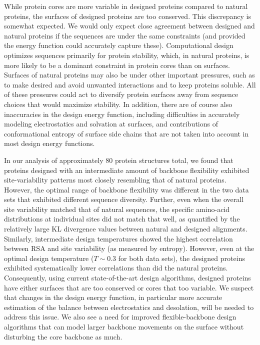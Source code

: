\documentclass[12pt]{article}
\begin{document}
While protein cores are more variable in designed proteins compared to natural proteins, the surfaces of designed proteins are too conserved. This discrepancy is somewhat expected. We would only expect close agreement between designed and natural proteins if the sequences are under the same constraints (and provided the energy function could accurately capture these). Computational design optimizes sequences primarily for protein stability, which, in natural proteins, is more likely to be a dominant constraint in protein cores than on surfaces. Surfaces of natural proteins may also be under other important pressures, such as to make desired and avoid unwanted interactions and to keep proteins soluble. All of these pressures could act to diversify protein surfaces away from sequence choices that would maximize stability. In addition, there are of course also inaccuracies in the design energy function, including difficulties in accurately modeling electrostatics and solvation at surfaces, and contributions of conformational entropy of surface side chains that are not taken into account in most design energy functions.

In our analysis of approximately 80 protein structures total, we found that proteins designed with an intermediate amount of backbone flexibility exhibited site-variability patterns most closely resembling that of natural proteins.  However, the optimal range of backbone flexibility was different in the two data sets that exhibited different sequence diversity. Further, even when the overall site variability matched that of natural sequences, the specific amino-acid distributions at individual sites did not match that well, as quantified by the relatively large KL divergence values between natural and designed alignments. Similarly, intermediate design temperatures showed the highest correlation between RSA and site variability (as measured by entropy). However, even at the optimal design temperature ($T \sim 0.3$ for both data sets), the designed proteins exhibited systematically lower correlations than did the natural proteins. Consequently, using current state-of-the-art design algorithms, designed proteins have either surfaces that are too conserved or cores that too variable. We suspect that changes in the design energy function, in particular more accurate estimation of the balance between electrostatics and desolation, will be needed to address this issue. We also see a need for improved flexible-backbone design algorithms that can model larger backbone movements on the surface without disturbing the core backbone as much.
\end{document}
